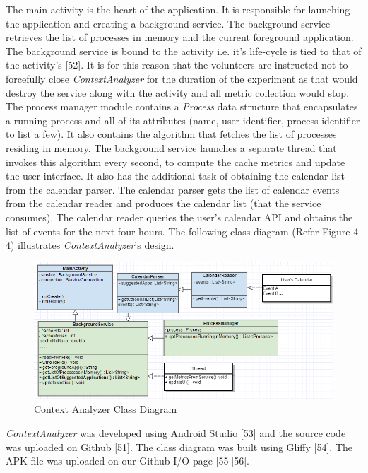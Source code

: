 \documentclass[12pt]{uthesis-v12}  %
\begin{document}
		The main activity is the heart of the application. It is responsible for launching the application and creating a background service. The background service retrieves the list of processes in memory and the current foreground application. The background service is bound to the activity i.e. it's life-cycle is tied to that of the activity's [52]. It is for this reason that the volunteers are instructed not to forcefully close {\em ContextAnalyzer} for the duration of the experiment as that would destroy the service along with the activity and all metric collection would stop. The process manager module contains a {\em Process} data structure that encapsulates a running process and all of its attributes (name, user identifier, process identifier to list a few). It also contains the algorithm that fetches the list of processes residing in memory. The background service launches a separate thread that invokes this algorithm every second, to compute the cache metrics and update the user interface. It also has the additional task of obtaining the calendar list from the calendar parser. The calendar parser gets the list of calendar events from the calendar reader and produces the calendar list (that the service consumes). The calendar reader queries the user's calendar API and obtains the list of events for the next four hours. The following class diagram (Refer Figure 4-4) illustrates {\em ContextAnalyzer}'s design.
	
		\begin{figure}[h]
			\centering
			\includegraphics[width = 150mm]{images/contextAnalyzerDesign.png}
			\caption[Context Analyzer Class Diagram]{Context Analyzer Class Diagram}
		\end{figure}
		   

		{\em ContextAnalyzer} was developed using Android Studio [53] and the source code was uploaded on Github [51]. The class diagram was built using Gliffy [54]. The APK file was uploaded on our Github I/O page [55][56].
\end{document}

